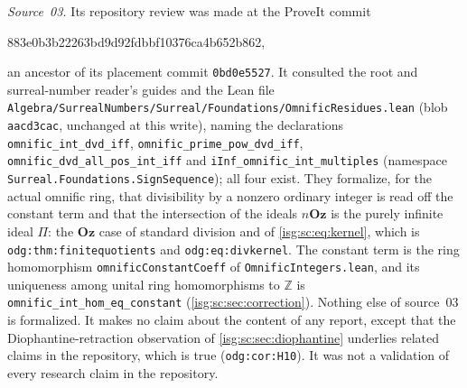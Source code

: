 \documentclass[11pt]{article}
\theoremstyle{definition}
\theoremstyle{remark}
\newcommand{\Oz}{\ensuremath{\mathbf{Oz}}}
\newcommand{\Z}{\mathbb{Z}}
\newcommand{\replabel}[1]{\nolinkurl{#1}}
\newcommand{\fn}[1]{\nolinkurl{#1}}
\begin{document}
\emph{Source~03.}\label{isg:sc:sec:relationLean} Its repository review was
made at the ProveIt commit
\begin{center}\small\ttfamily
883e0b3b22263bd9d92fdbbf10376ca4b652b862,
\end{center}
an ancestor of its placement commit \texttt{0bd0e5527}. It consulted the
root and surreal-number reader's guides and the Lean file
\fn{Algebra/SurrealNumbers/Surreal/Foundations/OmnificResidues.lean}
(blob \texttt{aacd3cac}, unchanged at this write), naming the
declarations \fn{omnific_int_dvd_iff}, \fn{omnific_prime_pow_dvd_iff},
\fn{omnific_dvd_all_pos_int_iff} and \fn{iInf_omnific_int_multiples}
(namespace \fn{Surreal.Foundations.SignSequence}); all four exist. They
formalize, for the actual omnific ring, that divisibility by a nonzero
ordinary integer is read off the constant term and that the intersection
of the ideals $n\Oz$ is the purely infinite ideal $\Pi$: the $\Oz$ case of
standard division and of \eqref{isg:sc:eq:kernel}, which is
\replabel{odg:thm:finitequotients} and \replabel{odg:eq:divkernel}. The
constant term is the ring homomorphism \fn{omnificConstantCoeff} of
\fn{OmnificIntegers.lean}, and its uniqueness among unital ring
homomorphisms to $\Z$ is \fn{omnific_int_hom_eq_constant}
(\cref{isg:sc:sec:correction}). Nothing else of source~03 is formalized.
It makes no claim about the content of any report, except that the
Diophantine-retraction observation of \cref{isg:sc:sec:diophantine}
underlies related claims in the repository, which is true
(\replabel{odg:cor:H10}). It was not a validation of every research claim
in the repository.
\end{document}
